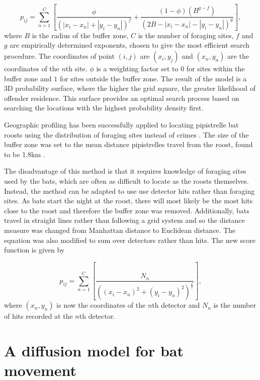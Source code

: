 \begin{equation}
p_{ij} = \sum_{n=1}^{C}\left[ \frac{\phi}{\left(|x_i - x_n| + |y_i - y_n|\right)^f} + \frac{(1-\phi)(B^{g-f})}{\left(2B - |x_i - x_n| - |y_i - y_n|\right)^g}    \right]  ,
\label{eqn:geo}
\end{equation}
%
where $B$ is the radius of the buffer zone, $C$ is the number of foraging sites, $f$ and $g$ are empirically determined exponents, chosen to give the most efficient search procedure. The coordinates of point $(i,j)$ are $(x_i,y_j)$ and $(x_n,y_n)$ are the coordinates of the $n$th site. $\phi$ is a weighting factor set to $0$ for sites within the buffer zone and $1$ for sites outside the buffer zone. The result of the model is a 3D probability surface, where the higher the grid square, the greater likelihood of offender residence. This surface provides an optimal search process based on searching the locations with the highest probability density first.

Geographic profiling has been successfully applied to locating pipistrelle bat roosts using the distribution of foraging sites instead of crimes \cite{Comber2006}. The size of the buffer zone was set to the mean distance pipistrelles travel from the roost, found to be 1.8km \cite{Racey1985}.

The disadvantage of this method is that it requires knowledge of foraging sites
used by the bats, which are often as difficult to locate as the roosts themselves. Instead, the method can be adapted to use use detector hits rather than foraging sites. As bats start the night at the roost, there will most likely be the most hits close to the roost and therefore the buffer zone was removed. Additionally, bats travel in straight lines rather than following a grid system and so the distance measure was changed from Manhattan distance to Euclidean distance. The equation was also modified to sum over detectors rather than hits. The new score function is given by

\begin{equation}
p_{ij} = \sum_{n=1}^{C}\left[ \frac{N_n}{\left((x_i - x_n)^2 + (y_i - y_n)^2\right) ^{\frac{f}{2}}   }   \right] ,
\label{eqn:geo2}
\end{equation}
%
where $(x_n,y_n)$ is now the coordinates of the $n$th detector and $N_n$ is the number of hits recorded at the $n$th detector.


\section{A diffusion model for bat movement}

